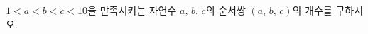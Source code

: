 \hspace*{2mm}\begin{minipage}[t]{\dimexpr\linewidth-2mm\relax}\vspace{0pt}
$1<a<b<c<10$을 만족시키는 자연수 $a$, $b$, $c$의 순서쌍 $(a,\,b,\,c)$의 개수를 구하시오.\end{minipage}
